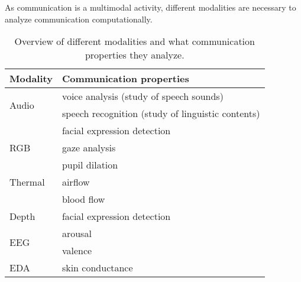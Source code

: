 As communication is a multimodal activity, different modalities are necessary to analyze communication computationally.


\begin{table}[]
\centering
\caption{Overview of different modalities and what communication properties they analyze.}
\label{tab:modality}
\begin{tabular}{l|l}
\toprule
\textbf{Modality}      & \textbf{Communication properties}                 \\ \midrule
\multirow{2}{*}{Audio} & voice analysis (study of speech sounds)           \\
                       & speech recognition (study of linguistic contents) \\ \midrule
\multirow{3}{*}{RGB}   & facial expression detection                       \\
                       & gaze analysis                                     \\
                       & pupil dilation                                    \\ \midrule
Thermal                & airflow                                           \\
                       & blood flow                                        \\ \midrule
Depth                  & facial expression detection                       \\ \midrule
\multirow{2}{*}{EEG}   & arousal                                           \\
                       & valence                                           \\ \midrule
EDA                    & skin conductance                                 
\end{tabular}
\end{table}
















